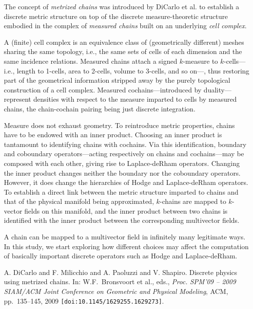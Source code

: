The concept of \emph{metrized chains} was introduced by DiCarlo et al. \cite{adc&09} to establish a discrete metric structure on top of the discrete measure-theoretic structure embodied in the complex of \emph{measured chains} built on an underlying \emph{cell complex}. \par
%
A (finite) cell complex is an equivalence class of (geometrically different) meshes sharing the same topology, i.e., the same sets of cells of each dimension and the same incidence relations. Measured chains attach a signed $k$-measure to $k$-cells---i.e., length to 1-cells, area to 2-cells, volume to 3-cells, and so on---, thus restoring part of the geometrical information stripped away by the purely topological construction of a cell complex. Measured cochains---introduced by duality---represent densities with respect to the measure imparted to cells by measured chains, the chain-cochain pairing being just discrete integration. \par
%
Measure does not exhaust geometry. To reintroduce metric properties, chains have to be endowed with an inner product. Choosing an inner product is tantamount to identifying chains with cochains. Via this identification, boundary and coboundary operators---acting respectively on chains and cochains---may be composed with each other, giving rise to Laplace-deRham operators. Changing the inner product changes neither the boundary nor the coboundary operators. However, it does change the hierarchies of Hodge and Laplace-deRham operators. To establish a direct link between the metric structure imparted to chains and that of the physical manifold being approximated, $k$-chains are mapped to $k$-vector fields on this manifold, and the inner product between two chains is identified with the inner product between the corresponding multivector fields. \par
% 
A chain can be mapped to a multivector field in infinitely many legitimate ways. In this study, we start exploring how different choices may affect the computation of basically important discrete operators such as Hodge and Laplace-deRham.



\begin{thebibliography}{10}

{\sc A. DiCarlo and F. Milicchio and A. Paoluzzi and V. Shapiro}. {Discrete physics using metrized chains}. In: W.F.~Bronsvoort et al., eds., \textit{Proc. SPM'09 -- 2009 SIAM/ACM Joint Conference on Geometric and Physical Modeling}, ACM, pp.~135--145, 2009 \texttt{[doi:10.1145/1629255.1629273]}.

\end{thebibliography}
